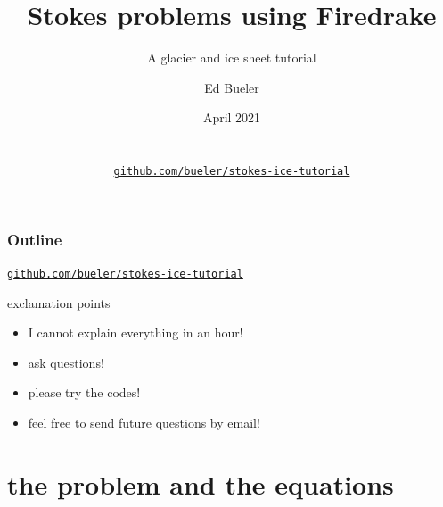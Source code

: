 \documentclass[10pt,hyperref,dvipsnames]{beamer}
\title{Stokes problems using Firedrake}
\subtitle{A glacier and ice sheet tutorial}
\author{Ed Bueler}
\institute[UAF]{University of Alaska Fairbanks}
\date[April 2021]{April 2021  \\ \phantom{foo} \\ \phantom{foo} \\
\large \href{https://github.com/bueler/stokes-ice-tutorial}{\alert{\texttt{github.com/bueler/stokes-ice-tutorial}}} }
\begin{document}
\beamertemplatenavigationsymbolsempty

\begin{frame}
  \maketitle
\end{frame}

\begin{frame}
  \frametitle{Outline}

\centerline{\large \href{https://github.com/bueler/stokes-ice-tutorial}{\alert{\texttt{github.com/bueler/stokes-ice-tutorial}}}}

\bigskip
  \tableofcontents[hideallsubsections]
\end{frame}

\begin{frame}{exclamation points}

\begin{itemize}
\item \alert{I cannot explain everything in an hour!}

\item \alert{ask questions!}

\item \alert{please try the codes!}

\item \alert{feel free to send future questions by email!}
\end{itemize}
\end{frame}

\section{the problem and the equations}
\end{document}
